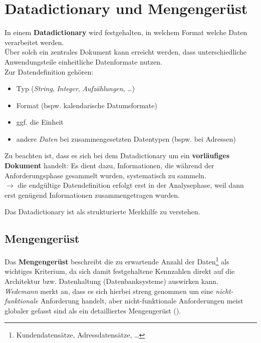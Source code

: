 \section{Datadictionary und Mengengerüst}\label{sec:datadictionary-und-mengengerust}
In einem \textbf{Datadictionary} wird festgehalten, in welchem Format welche Daten verarbeitet werden.\\

\noindent
Über solch ein zentrales Dokument kann erreicht werden, dass unterschiedliche Anwendungsteile einheitliche Datenformate nutzen.\\

\noindent
Zur Datendefinition gehören:

\begin{itemize}
    \item Typ (\textit{String}, \textit{Integer}, \textit{Aufzählungen}, \ldots)
    \item Format (bspw. kalendarische Datumsformate)
    \item ggf. die Einheit
    \item andere \textit{Daten} bei zusammengesetzten Datentypen (bspw. bei Adressen)
\end{itemize}

\noindent
Zu beachten ist, dass es sich bei dem Datadictionary um ein \textbf{vorläufiges Dokument} handelt: Es dient dazu, Informationen, die während der Anforderungsphase gesammelt wurden, systematisch zu sammeln.\\
$\rightarrow$ die endgültige Datendefinition erfolgt erst in der Analysephase, weil dann erst genügend Informationen zusammengetragen wurden.

\vspace{5mm}
\begin{tcolorbox}
    Das Datadictionary ist als strukturierte Merkhilfe zu verstehen.
\end{tcolorbox}
\vspace{5mm}

\subsection{Mengengerüst}
Das \textbf{Mengengerüst} beschreibt die zu erwartende Anzahl der Daten\footnote{Kundendatensätze, Adressdatensätze, \ldots} als wichtiges Kriterium, da sich damit festgehaltene Kennzahlen direkt auf die Architektur bzw. Datenhaltung (Datenbanksysteme) auswirken kann.\\

\noindent
\textit{Wedemann} merkt an, dass es sich hierbei streng genommen um eine \textit{nicht-funktionale} Anforderung handelt, aber nicht-funktionale Anforderungen meist globaler gefasst sind als ein detailliertes Mengengerüst (\cite[76]{Wed09}).